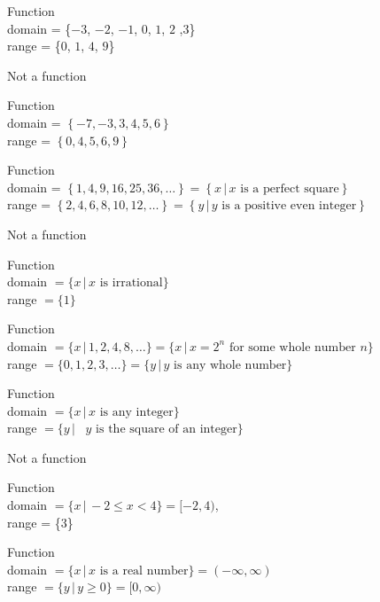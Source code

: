 \begin{exenum}
      
\item Function \\ domain = \{$-3$, $-2$, $-1$, $0$, $1$, $2$ ,$3$\} \\ range = \{$0$, $1$, $4$, $9$\}

\item Not a function

\item  Function \\ domain = $\left\{ -7, -3, 3, 4, 5, 6 \right\}$ \\ range = $\left\{ 0,4,5,6,9 \right\}$

\item  Function \\ domain =   $\left\{ 1, 4, 9, 16, 25, 36, \ldots \right\} = \left\{ x \, | \, \text{$x$ is a perfect square} \right\}$ \\ range =  $\left\{ 2, 4, 6, 8, 10, 12, \ldots \right\} = \left\{ y \, | \, \text{$y$ is a positive even integer} \right\}$

\item Not a function

\item Function \\ domain $= \{x \, | \, \text{$x$ is irrational} \}$ \\ range $= \{ 1\}$

\item Function \\ domain  $= \{x \, | \, 1, 2, 4, 8, \ldots \} = \{x \, | \, \text{$x = 2^{n}$ for some whole number $n$} \}$ \\ range $= \{ 0, 1, 2, 3, \ldots \} = \{y \, | \, \text{$y$ is any whole number}\}$

\item Function \\ domain $= \{x \, | \, \text{$x$ is any integer} \}$ \\ range $= \{y \, | \, \text{ $y$ is the square of an integer}\}$

\item Not a function

\item Function \\ domain  $= \{x \, | \, -2 \leq x < 4 \} = [-2, 4)$, \\ range = \{$3$\}

\item Function \\ domain $= \{x \, | \,  \text{$x$ is a real number} \} = (-\infty, \infty)$ \\  range $= \{y \, | \,  y \geq 0 \} = [0,\infty)$


\end{exenum}
